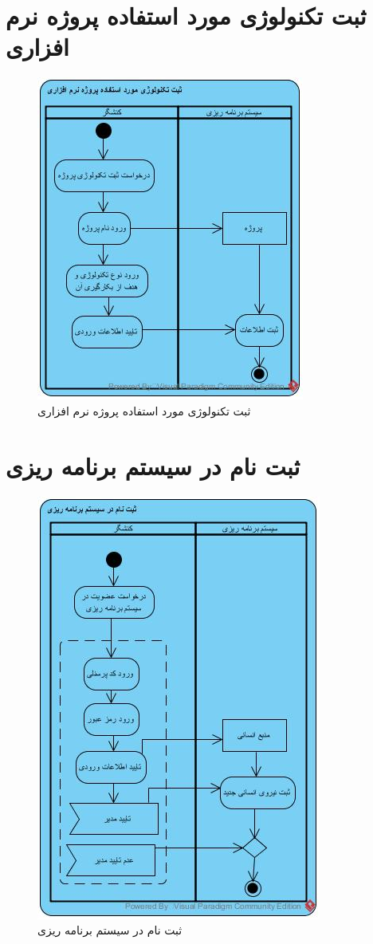 \section{ثبت تکنولوژی مورد استفاده پروژه نرم افزاری}
\begin{figure}[H]
	\centering
	\includegraphics[scale=1]{img/activity/AddTechnology}
	\caption{ثبت تکنولوژی مورد استفاده پروژه نرم افزاری}
\end{figure}

\section{ثبت نام در سیستم برنامه ریزی}
\begin{figure}[H]
	\centering
	\includegraphics[scale=0.9]{img/activity/SignUp}
	\caption{ثبت نام در سیستم برنامه ریزی}
\end{figure}

